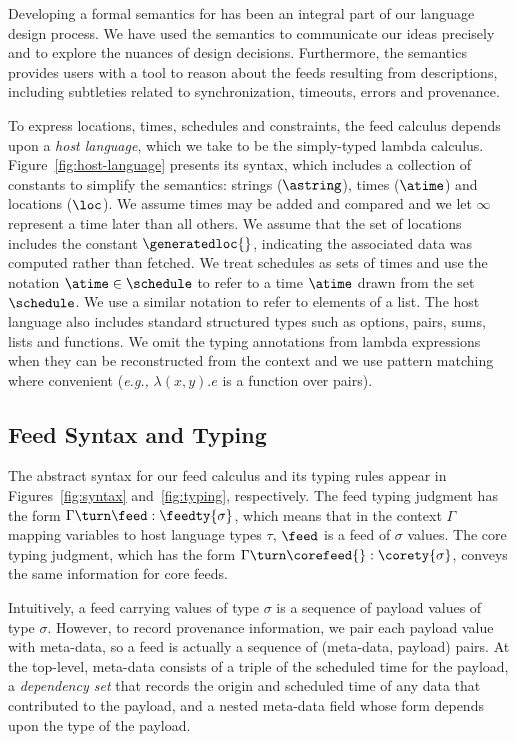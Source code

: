 
Developing a formal semantics for \padsd{} has been an integral part
of our language design process.  We have used the semantics to
communicate our ideas precisely and to explore the nuances of design
decisions. Furthermore, the semantics provides users with a tool to
reason about the feeds resulting from \padsd{} descriptions, including
subtleties related to synchronization, timeouts, errors and provenance.

To express locations, times, schedules and constraints, the feed calculus
depends upon a {\em host language}, which we take to be the
simply-typed lambda calculus.  Figure~\ref{fig:host-language} presents
its syntax, which includes a collection of constants to simplify the
semantics: strings ($\astring$), times ($\atime$) and locations
($\loc$).  We assume times may be added and 
compared and we let $\infty$ represent a time later than all others.
We assume that the set of locations includes the constant
$\generatedloc{}$, indicating the associated data was computed rather
than fetched.
We treat schedules as sets of times and use the notation $\atime
\in \schedule$ to refer to a time $\atime$ drawn from the set
$\schedule$.  We use a similar notation to refer to elements of a
list.  The host language also includes standard structured types such as
options, pairs, sums, lists and functions.
We omit the typing annotations from lambda expressions when they can
be reconstructed from the context and we use pattern matching 
where convenient ({\em e.g.,} $\lambda (x,y).e$ is a function
over pairs).


\subsection{Feed Syntax and Typing}
The abstract syntax for our feed calculus and its typing rules appear
in Figures~\ref{fig:syntax} and~\ref{fig:typing}, respectively.  
The feed typing judgment has the form 
$\Gamma \turn \feed : \feedty{\sigma}$, 
which means that in the context $\Gamma$ mapping variables to host
language types $\tau$, $\feed$ is a feed of $\sigma$ values. 
The core typing judgment, which has the form 
$\Gamma \turn \corefeed{} : \corety{\sigma}$, conveys the same
information for core feeds.

Intuitively, a feed carrying values of type $\sigma$ is a sequence of
payload values of type $\sigma$.  However, to record provenance
information, we pair each payload value with meta-data, so a feed is
actually a sequence of (meta-data, payload) pairs.  At the top-level,
meta-data consists of a triple of the scheduled time for the payload,
a \textit{dependency set} that records the origin and scheduled time of any data
that contributed to the payload, and a nested meta-data field whose
form depends upon the type of the payload.

